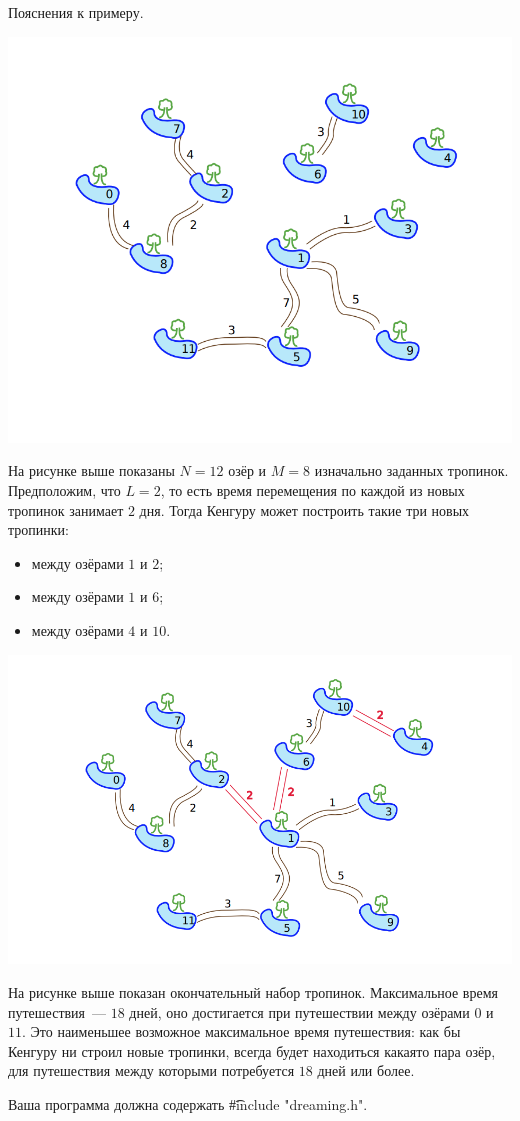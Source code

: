 Пояснения к примеру.

\includegraphics{dreaming1.png}

На рисунке выше показаны $N = 12$ озёр и $M = 8$ изначально заданных тропинок.
Предположим, что $L = 2$, то есть время перемещения по каждой из новых тропинок
занимает $2$ дня. Тогда Кенгуру может построить такие три новых тропинки:
\begin{itemize}
\item между озёрами $1$ и $2$;
\item между озёрами $1$ и $6$;
\item между озёрами $4$ и $10$.
\end{itemize}

\includegraphics{dreaming2.png}

На рисунке выше показан окончательный набор тропинок. Максимальное время
путешествия~--- $18$ дней, оно достигается при путешествии между озёрами $0$ и $11$. Это
наименьшее возможное максимальное время путешествия: как бы Кенгуру ни строил
новые тропинки, всегда будет находиться какая­то пара озёр, для путешествия между
которыми потребуется $18$ дней или более.

Ваша программа должна содержать \t{\#include "dreaming.h"}.